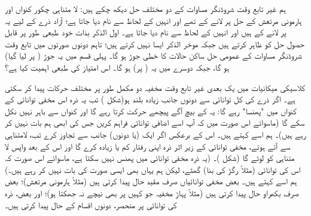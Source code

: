  ہم  غیر تابع وقت شروڈنگر مساوات کے دو مختلف حل دیکھ چکے ہیں:  لا متناہی چکور  کنواں اور ہارمونی مرتعش کے حل  پر لانے کے  تھے اور انہیں   کے لحاظ سے نام دیا جاتا ہے؛  آزاد ذرے کے لیے یہ  پر لانے کے  ہیں اور انہیں   کے لحاظ  سے نام دیا جاتا ہے۔ اول الذکر بذات خود طبعی طور پر قابل حصول حل کو ظاہر کرتے ہیں جبکہ موخر الذکر  ایسا نہیں کرتے ہیں؛ تاہم دونوں صورتوں میں تابع وقت شروڈنگر  مساوات کے عمومی حل ساکن حالات کا خطی جوڑ ہو گا۔ پہلی قسم میں یہ جوڑ  ( پر لیا گیا)  ہو گا، جبکہ دوسرے میں یہ ( پر)  ہو گا۔ اس امتیاز کی طبعی اہمیت کیا ہے؟

 کلاسیکی میکانیات میں یک بعدی غیر تابع وقت مخفیہ دو مکمل طور پر مختلف حرکات پیدا کر سکتی ہے۔ اگر   ذرے کی کل توانائی  سے دونوں  جانب زیادہ بلند ہو(شکل  ) تب یہ ذرہ اس مخفی توانائی کے کنواں میں "پھنسا" رہے گا: یہ  کے بیچ آگے پیچھے حرکت کرتا رہے گا اور کنواں سے باہر نہیں نکل سکے گا (ماسوائے اس صورت میں کہ آپ اسے اضافی توانائی فراہم کریں جس کی ابھی ہم بات نہیں کر رہے ہیں)۔ ہم اسے  کہتے ہیں۔ اس کے برعکس اگر   ایک (یا دونوں) جانب     سے  تجاوز کرے تب،  لامتناہی سے آتے ہوئے، مخفی توانائی کے زیر اثر ذرہ اپنی رفتار کم یا زیادہ  کرے گا اور اس کے بعد واپس لا متناہی کو لوٹے گا   (شکل  )۔ (یہ ذرہ مخفی توانائی میں پھنس نہیں سکتا ہے، ماسوائے اس صورت  کہ اس کی توانائی (مثلاً رگڑ کی بنا) گھٹے، لیکن ہم یہاں بھی ایسی صورت کی بات نہیں کر رہے ہیں۔) ہم اسے  کہتے ہیں۔ بعض مخفی توانائیاں صرف مقید حال پیدا کرتی ہیں (مثلاً ہارمونی  مرتعش)؛  بعض صرف بکھراو حال پیدا کرتی  ہیں (مثلاً  پہاڑ مخفیہ  جو کہیں پر بھی نیچے نہ جھکتا ہو)؛ اور بعض، ذرہ کی توانائی پر منحصر، دونوں اقسام کے حال پیدا کرتی ہیں۔

